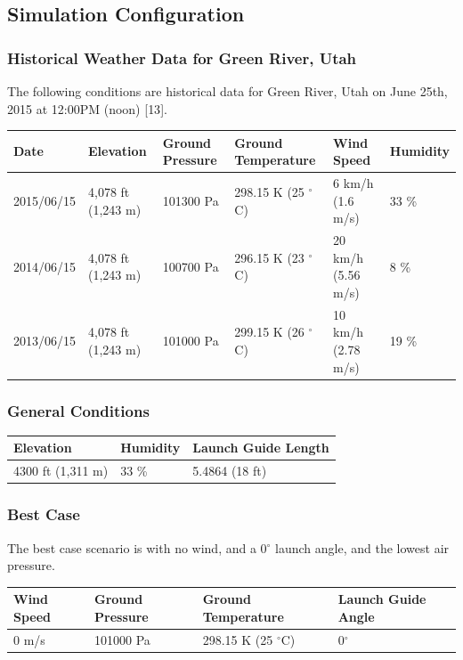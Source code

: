 \documentclass[]{article}
\begin{document}
\subsection{Simulation Configuration}\label{simulation-configuration}

\subsubsection{Historical Weather Data for Green River,
Utah}\label{historical-weather-data-for-green-river-utah}

The following conditions are historical data for Green River, Utah on
June 25th, 2015 at 12:00PM (noon) {[}13{]}.

\begin{longtable}[c]{@{}llllll@{}}
\toprule
Date & Elevation & Ground Pressure & Ground Temperature & Wind Speed &
Humidity\tabularnewline
\midrule
\endhead
2015/06/15 & 4,078 ft (1,243 m) & 101300 Pa & 298.15 K (25 \(^\circ\)C)
& 6 km/h (1.6 m/s) & 33 \%\tabularnewline
2014/06/15 & 4,078 ft (1,243 m) & 100700 Pa & 296.15 K (23 \(^\circ\)C)
& 20 km/h (5.56 m/s) & 8 \%\tabularnewline
2013/06/15 & 4,078 ft (1,243 m) & 101000 Pa & 299.15 K (26 \(^\circ\)C)
& 10 km/h (2.78 m/s) & 19 \%\tabularnewline
\bottomrule
\end{longtable}


\subsubsection{General Conditions}\label{general-conditions}

\begin{longtable}[c]{@{}lll@{}}
\toprule
Elevation & Humidity & Launch Guide Length\tabularnewline
\midrule
\endhead
4300 ft (1,311 m) & 33 \% & 5.4864 (18 ft)\tabularnewline
\bottomrule
\end{longtable}


\subsubsection{Best Case}\label{best-case}

The best case scenario is with no wind, and a 0\(^\circ\) launch angle,
and the lowest air pressure.

\begin{longtable}[c]{@{}llll@{}}
\toprule
Wind Speed & Ground Pressure & Ground Temperature & Launch Guide
Angle\tabularnewline
\midrule
\endhead
0 m/s & 101000 Pa & 298.15 K (25 \(^\circ\)C) &
0\(^\circ\)\tabularnewline
\bottomrule
\end{longtable}
\end{document}
